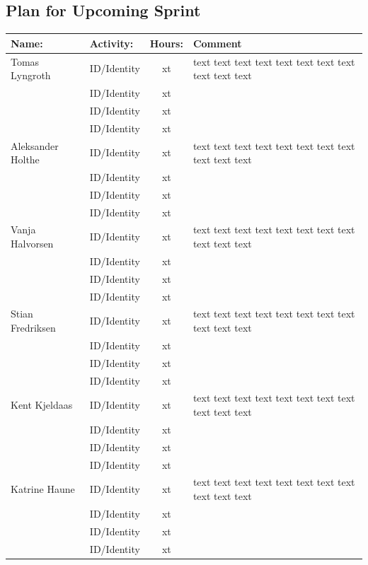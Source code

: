 \documentclass{article}
\begin{document}
\begin{center}
\section*{Plan for Upcoming Sprint}
\begin{tabular}{|l|l|c|l|}
\hline
\rowcolor{cadetgrey}
\textbf{Name:}    &\textbf{Activity:} 	 &\textbf{Hours:}     &\textbf{Comment}  \\
\hline
Tomas Lyngroth   & ID/Identity   & xt    & text text text text text text text text text text text\\ \rowcolor{gainsboro}
                 & ID/Identity   & xt    & \\
                 & ID/Identity   & xt    & \\\rowcolor{gainsboro}
                 & ID/Identity   & xt    & \\
\hline                                                
Aleksander Holthe& ID/Identity   & xt    & text text text text text text text text text text text\\ \rowcolor{gainsboro}
                 & ID/Identity   & xt    & \\
                 & ID/Identity   & xt    & \\\rowcolor{gainsboro}
                 & ID/Identity   & xt    & \\
\hline  
Vanja Halvorsen  & ID/Identity   & xt    & text text text text text text text text text text text\\ \rowcolor{gainsboro}
                 & ID/Identity   & xt    & \\
                 & ID/Identity   & xt    & \\\rowcolor{gainsboro}
                 & ID/Identity   & xt    & \\
\hline  
Stian Fredriksen & ID/Identity   & xt    & text text text text text text text text text text text\\ \rowcolor{gainsboro}
                 & ID/Identity   & xt    & \\
                 & ID/Identity   & xt    & \\\rowcolor{gainsboro}
                 & ID/Identity   & xt    & \\
\hline  
Kent Kjeldaas    & ID/Identity   & xt    & text text text text text text text text text text text\\ \rowcolor{gainsboro}
                 & ID/Identity   & xt    & \\
                 & ID/Identity   & xt    & \\\rowcolor{gainsboro}
                 & ID/Identity   & xt    & \\
\hline  
Katrine Haune    & ID/Identity   & xt    & text text text text text text text text text text text\\ \rowcolor{gainsboro}
                 & ID/Identity   & xt    & \\
                 & ID/Identity   & xt    & \\\rowcolor{gainsboro}
                 & ID/Identity   & xt    & \\
\hline  
\end{tabular}  


\end{center}
\end{document}
